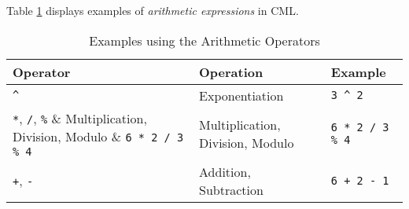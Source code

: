 Table \ref{tab:arithmetic-examples} displays examples of \emph{arithmetic expressions}
in CML.

\begin{table}[H]
\centering
\begin{tabular}
{ l l l }
\hline
Operator & Operation & Example \\
\hline
\verb!^! & Exponentiation & \verb!3 ^ 2! \\
\verb!*!, \verb!/!, \verb!%! & Multiplication, Division, Modulo & \verb!6 * 2 / 3 % 4!  \\
\verb!+!, \verb!-! & Addition, Subtraction & \verb!6 + 2 - 1! \\
\end{tabular}
\caption{Examples using the Arithmetic Operators}
\label{tab:arithmetic-examples}
\end{table}
